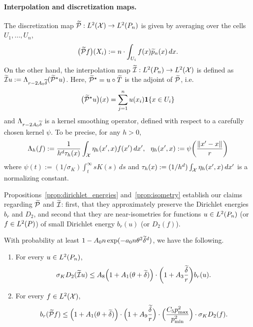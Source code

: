 \paragraph{Interpolation and discretization maps.}
The discretization map  $\widetilde{\mathcal{P}}: L^2(\mathcal{X}) \to L^2(P_n)$ is given by averaging over the cells $U_1,\ldots,U_n$, 
\begin{equation*}
\bigl(\widetilde{\mathcal{P}}f\bigr)(X_i) := n \cdot \int_{U_i} f(x) \widetilde{p}_n(x) \,dx.
\end{equation*}
On the other hand, the interpolation map $\widetilde{\mathcal{I}}: L^2(P_n) \to L^2(\mathcal{X})$ is defined as $\widetilde{\mathcal{I}}u := \Lambda_{r - 2A_0\widetilde{\delta}}(\widetilde{\mathcal{P}}^{\star}u)$. Here, $\widetilde{\mathcal{P}}^{\star} = u \circ \widetilde{T}$ is the adjoint of $\widetilde{\mathcal{P}}$, i.e.
\begin{equation*}
\bigl(\widetilde{\mathcal{P}}^{\star}u\bigr)(x) = \sum_{j = 1}^{n} u(x_i) \mathbf{1}\{x \in U_i\} 
\end{equation*} 
and $\Lambda_{r - 2A_0\widetilde{\delta}}$ is a kernel smoothing operator, defined with respect to a carefully chosen kernel $\psi$. To be precise, for any $h > 0$,
\begin{equation*}
\Lambda_h(f) := \frac{1}{h^d\tau_h(x)}\int_{\mathcal{X}} \eta_h(x',x) f(x') \,dx',~~ \eta_h(x',x) := \psi\biggl(\frac{\|x' - x\|}{r}\biggr)
\end{equation*}
where $\psi(t) := (1/\sigma_K)\int_{t}^{\infty} s K(s) \,ds$ and $\tau_h(x) := (1/h^d)\int_{\mathcal{X}} \eta_h(x',x) \,dx'$ is a normalizing constant.

Propositions~\ref{prop:dirichlet_energies} and~\ref{prop:isometry} establish our claims regarding $\widetilde{\mathcal{P}}$ and $\widetilde{\mathcal{I}}$: first, that they approximately preserve the Dirichlet energies $b_r$ and $D_2$, and second that they are near-isometries for functions $u \in L^2(P_n)$ (or $f \in L^2(P)$) of small Dirichlet energy $b_r(u)$ (or $D_2(f)$).

\begin{proposition}
	\label{prop:dirichlet_energies}
	With probability at least $1 - A_0n\exp(-a_0n\theta^2\widetilde{\delta}^{d})$, we have the following.
	\begin{enumerate}[(1)]
		\item For every $u \in L^2(P_n)$,
		\begin{equation}
		\label{eqn:dirichlet_energies_1}
		\sigma_{K} D_2(\widetilde{\mathcal{I}}u) \leq A_8 \Bigl(1 + A_1(\theta + \widetilde{\delta})\Bigr) \cdot \biggl(1 + A_3\frac{\widetilde{\delta}}{r}\biggr) b_r(u).
		\end{equation}
		\item For every $f \in L^2(\mathcal{X})$,
		\begin{equation}
		\label{eqn:dirichlet_energies_2}
		b_r(\widetilde{\mathcal{P}}f) \leq \Bigl(1 + A_1(\theta + \widetilde{\delta})\Bigr) \cdot \Bigl(1 + A_9\frac{\widetilde{\delta}}{r}\Bigr) \cdot \Bigl(\frac{C_5 p_{\max}^2}{p_{\min}^2}\Bigr) \cdot \sigma_{K} D_2(f).
		\end{equation}
	\end{enumerate}
\end{proposition}

